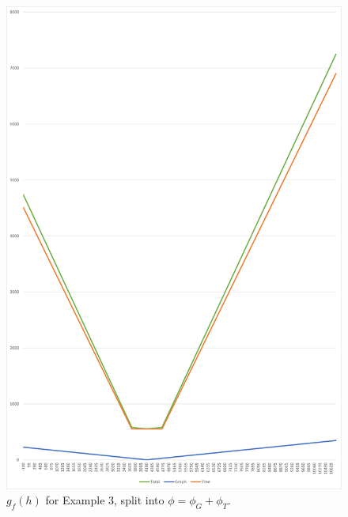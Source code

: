 \begin{figure}
\includegraphics[scale=.62]{optstep3diff.png}
\caption{$g_f(h)$ for Example 3, split into $\phi=\phi_G+\phi_T$.}
\label{ex_optstep3diff}
\end{figure}

